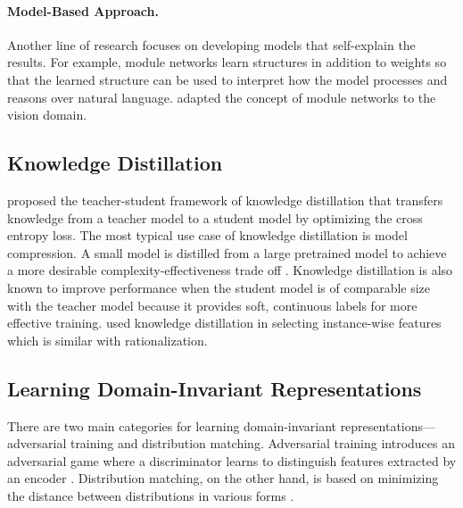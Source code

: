 \documentclass[letterpaper]{article} %
\begin{document}





\paragraph{Model-Based Approach.}
Another line of research focuses on developing models that self-explain the results. For example, module networks \cite{Andreas2016LearningTC} learn structures in addition to weights so that the learned structure can be used to interpret how the model processes and reasons over natural language. \citet{Johnson2017InferringAE} adapted the concept of module networks to the vision domain.

\subsection{Knowledge Distillation}

\citet{hinton2015distilling} proposed the teacher-student framework of knowledge distillation that transfers knowledge from a teacher model to a student model by optimizing the cross entropy loss. The most typical use case of knowledge distillation is model compression. A small model is distilled from a large pretrained model to achieve a more desirable complexity-effectiveness trade off \cite{Sanh2019DistilBERTAD,Jiao2019TinyBERTDB}. Knowledge distillation is also known to improve performance when the student model is of comparable size with the teacher model \cite{yim2017gift,furlanello2018born,wang2020knowledge} because it provides soft, continuous labels for more effective training. \cite{yoon2018invase} used knowledge distillation in selecting instance-wise features which is similar with rationalization.

\subsection{Learning Domain-Invariant Representations}

There are two main categories for learning domain-invariant representations---adversarial training and distribution matching. 
Adversarial training introduces an adversarial game where a discriminator learns to distinguish features extracted by an encoder \cite{Ganin2015UnsupervisedDA}. Distribution matching, on the other hand, is based on minimizing the distance between distributions in various forms \cite{Zellinger2017CentralMD,Gretton2006AKM,Li2015GenerativeMM}. 
\end{document}
